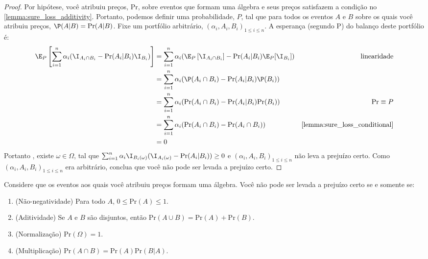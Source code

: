 \begin{proof}
 Por hipótese, você atribuiu preços, $\text{Pr}$, 
 sobre eventos que formam uma álgebra e 
 seus preços satisfazem a condição no \cref{lemma:sure_loss_additivity}.
 Portanto, podemos definir uma probabilidade, $P$,
 tal que para todos os eventos $A$ e $B$ sobre 
 os quais você atribuiu preços,
 $\P(A|B) = \text{Pr}(A|B)$.
 Fixe um portfólio arbitrário,
 $(\alpha_{i},A_{i},B_{i})_{1 \leq i \leq n}$.
 A esperança (segundo P) do balanço deste portfólio é:
 \begin{align*}
  \E_{P}\left[\sum_{i=1}^{n}{\alpha_i (\I_{A_{i} \cap B_i}
  -\text{Pr}(A_i|B_{i})\I_{B_i})}\right]
  &= \sum_{i=1}^{n}{\alpha_i(\E_{P}\left[\I_{A_{i} \cap B_i}\right]-\text{Pr}(A_i|B_i)\E_{P}[\I_{B_{i}}])}
  & \text{linearidade} \\
  &= \sum_{i=1}^{n}{\alpha_i(\P(A_{i} \cap B_{i})
  -\text{Pr}(A_i|B_i)\P(B_i))} \\
  &= \sum_{i=1}^{n}{\alpha_i(\text{Pr}(A_{i} \cap B_{i})
  -\text{Pr}(A_i|B_i)\text{Pr}(B_i))}	
  & \text{Pr} \equiv P \\
  &= \sum_{i=1}^{n}{\alpha_i(\text{Pr}(A_{i} \cap B_{i})
  -\text{Pr}(A_i \cap B_i))}
  & \text{\cref{lemma:sure_loss_conditional}} \\
  &= 0
 \end{align*}
 Portanto \citep[p.24]{Kadane2011}, existe 
 $\omega \in \Omega$, tal que 
 $\sum_{i=1}^{n}{\alpha_i \I_{B_{i}(\omega)}(\I_{A_{i}(\omega)}-\text{Pr}(A_i|B_{i}))} \geq 0$ e
 $(\alpha_{i},A_{i},B_{i})_{1 \leq i \leq n}$ não 
 leva a prejuízo certo.
 Como $(\alpha_{i},A_{i},B_{i})_{1 \leq i \leq n}$ era
 arbitrário, conclua que 
 você não pode ser levada a prejuízo certo.
\end{proof}

\begin{theorem}
 \label{theorem:coherence}
 Considere que os eventos aos quais 
 você atribuiu preços formam uma álgebra.
 Você não pode ser levada a prejuízo certo 
 se e somente se:
 \begin{enumerate}
  \item (Não-negatividade) Para todo $A$, 
  $0 \leq \text{Pr}(A) \leq 1$.
  \item (Aditividade) Se $A$ e $B$ são disjuntos, então
  $\text{Pr}(A \cup B) = \text{Pr}(A)+\text{Pr}(B)$.
  \item (Normalização) $\text{Pr}(\Omega) = 1$.
  \item (Multiplicação) $\text{Pr}(A \cap B) = \text{Pr}(A)\text{Pr}(B|A)$.
 \end{enumerate}
\end{theorem}

